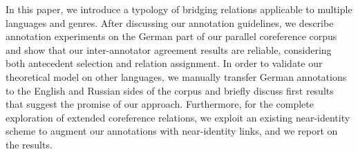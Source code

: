 In this paper, we introduce a typology of bridging relations applicable to multiple languages and genres. After discussing our annotation guidelines, we describe annotation experiments on the German part of our parallel coreference corpus and show that our inter-annotator agreement results are reliable, considering both antecedent selection and relation assignment. In order to validate our theoretical model on other languages, we manually transfer German annotations to the English and Russian sides of the corpus and briefly discuss first results that suggest the promise of our approach. Furthermore, for the complete exploration of extended coreference relations, we exploit an existing near-identity scheme to augment our annotations with near-identity links, and we report on the results.

